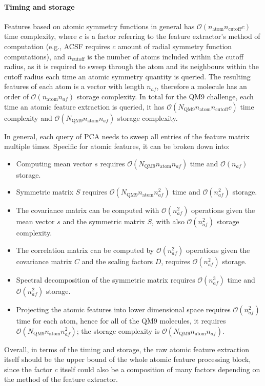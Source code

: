 \documentclass[12pt]{article}
\begin{document}
\paragraph{Timing and storage}
Features based on atomic symmetry functions in general has $\mathcal{O}(n_\text{atom}n_\text{cutoff}c)$ time complexity, where $c$ is a factor referring to the feature extractor's method of computation (e.g., ACSF requires $c$ amount of radial symmetry function computations), and $n_\text{cutoff}$ is the number of atoms included within the cutoff radius, as it is required to sweep through the atom and its neighbours within the cutoff radius each time an atomic symmetry quantity is queried. The resulting features of each atom is a vector with length $n_{af}$, therefore a molecule has an order of $\mathcal{O}(n_\text{atom}n_{af})$ storage complexity. In total for the QM9 challenge, each time an atomic feature extraction is queried, it has $\mathcal{O}(N_\text{QM9}n_\text{atom}n_\text{cutoff}c)$ time complexity and $\mathcal{O}(N_\text{QM9}n_\text{atom}n_{af})$ storage complexity.

In general, each query of PCA needs to sweep all entries of the feature matrix multiple times. Specific for atomic features, it can be broken down into:
\begin{itemize}
	\item Computing mean vector $s$ requires $\mathcal{O}(N_\text{QM9}n_\text{atom}n_{af})$ time and $\mathcal{O}(n_{af})$ storage.
	\item Symmetric matrix $S$ requires $\mathcal{O}(N_\text{QM9}n_\text{atom}n^2_{af})$ time and $\mathcal{O}(n^2_{af})$ storage.
	\item The covariance matrix can be computed with $\mathcal{O}(n^2_{af})$ operations given the mean vector $s$ and the symmetric matrix $S$, with also $\mathcal{O}(n^2_{af})$ storage complexity.
	\item The correlation matrix can be computed by $\mathcal{O}(n^2_{af})$ operations given the covariance matrix $C$ and the scaling factors $D$, requires $\mathcal{O}(n^2_{af})$ storage.
	\item Spectral decomposition of the symmetric matrix requires $\mathcal{O}(n^3_{af})$ time and $\mathcal{O}(n^2_{af})$ storage.
	\item Projecting the atomic features into lower dimensional space requires $\mathcal{O}(n^2_{af})$ time for each atom, hence for all of the QM9 molecules, it requires $\mathcal{O}(N_\text{QM9}n_\text{atom}n^2_{af})$; the storage complexity is $\mathcal{O}(N_\text{QM9}n_\text{atom}n_{af})$.
\end{itemize}
Overall, in terms of the timing and storage, the raw atomic feature extraction itself should be the upper bound of the whole atomic feature processing block, since the factor $c$ itself could also be a composition of many factors depending on the method of the feature extractor.
\end{document}

